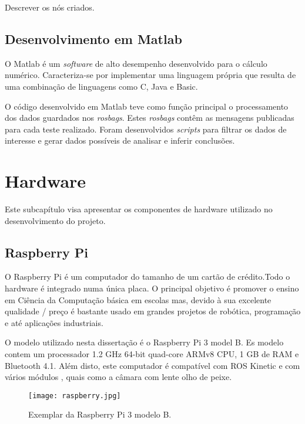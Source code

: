 Descrever os nós criados.

\subsection{Desenvolvimento em Matlab}

O Matlab é um \textit{software} de alto desempenho desenvolvido para o cálculo numérico. Caracteriza-se por implementar uma linguagem própria que resulta de uma combinação de linguagens como C, Java e Basic.

O código desenvolvido em Matlab teve como função principal o processamento dos dados guardados nos \textit{rosbags}. Estes \textit{rosbags} contêm as mensagens publicadas para cada teste realizado. Foram desenvolvidos \textit{scripts} para filtrar os dados de interesse e gerar dados possíveis de analisar e inferir conclusões.

\section{Hardware}

Este subcapítulo visa apresentar os componentes de hardware utilizado no desenvolvimento do projeto.

\subsection{Raspberry Pi}

O Raspberry Pi é um computador do tamanho de um cartão de crédito.Todo o hardware é integrado numa única placa. O principal objetivo é promover o ensino em Ciência da Computação básica em escolas mas, devido à sua excelente qualidade / preço é bastante usado em grandes projetos de robótica, programação e até aplicações industriais. 

O modelo utilizado nesta dissertação é o Raspberry Pi 3 model B. Es modelo contem um processador 1.2 GHz 64-bit quad-core ARMv8 CPU, 1 GB de RAM e Bluetooth 4.1. Além disto, este computador é compatível com ROS Kinetic e com vários módulos , quais como a câmara com lente olho de peixe.

\begin{figure}[h!] %
	\begin{center}
		\leavevmode		
		\texttt{[image: raspberry.jpg]}
		\caption{Exemplar da Raspberry Pi 3 modelo B.}
		\label{fig:raspberry}
	\end{center}
\end{figure}


